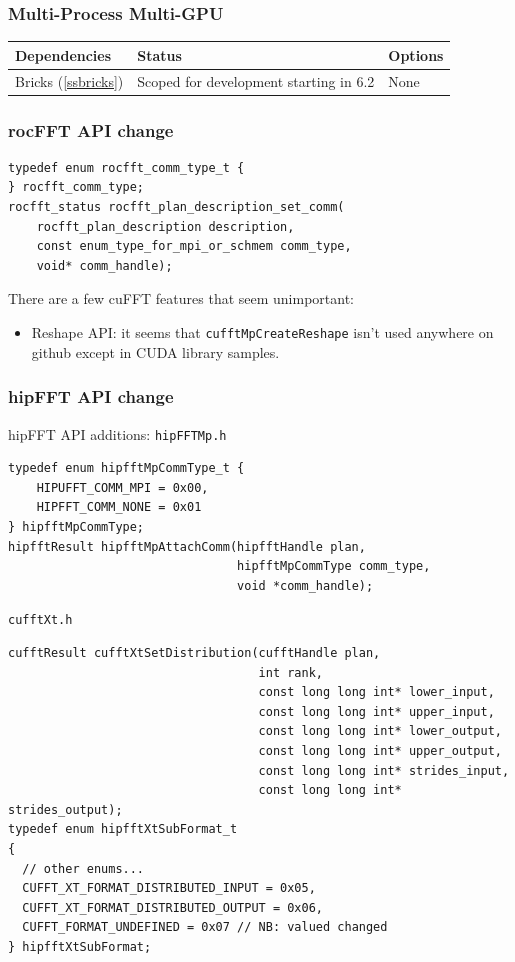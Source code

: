 \documentclass[12pt]{article}
\renewcommand{\(}{\left(}
\renewcommand{\)}{\right)}
\begin{document}
\newpage
\subsubsection{Multi-Process Multi-GPU}
\label{ssmpmgpu}

\begin{center}
  \begin{tabular}{|l|l|l|}
    \hline
    Dependencies & Status & Options \\
    \hline
    Bricks (\ref{ssbricks}) & Scoped for development starting in 6.2  & None \\
    \hline
  \end{tabular}
\end{center}


\subsubsection{rocFFT API change}
\begin{lstlisting}
typedef enum rocfft_comm_type_t {
} rocfft_comm_type;
rocfft_status rocfft_plan_description_set_comm(
    rocfft_plan_description description,
    const enum_type_for_mpi_or_schmem comm_type,
    void* comm_handle);
\end{lstlisting}

 There are a few cuFFT
features that seem unimportant:
\begin{itemize}
\item Reshape API: it seems that \texttt{cufftMpCreateReshape} isn't
  used anywhere on github except in CUDA library samples.
\end{itemize}

\subsubsection{hipFFT API change}
\noindent
hipFFT API additions:
\texttt{hipFFTMp.h}
\begin{lstlisting}
typedef enum hipfftMpCommType_t {
    HIPUFFT_COMM_MPI = 0x00,
    HIPFFT_COMM_NONE = 0x01
} hipfftMpCommType;
hipfftResult hipfftMpAttachComm(hipfftHandle plan,
                                hipfftMpCommType comm_type,
                                void *comm_handle);
\end{lstlisting}
\texttt{cufftXt.h}
\begin{lstlisting}
cufftResult cufftXtSetDistribution(cufftHandle plan, 
                                   int rank, 
                                   const long long int* lower_input,  
                                   const long long int* upper_input,
                                   const long long int* lower_output,
                                   const long long int* upper_output,
                                   const long long int* strides_input, 
                                   const long long int* strides_output);
typedef enum hipfftXtSubFormat_t
{
  // other enums...
  CUFFT_XT_FORMAT_DISTRIBUTED_INPUT = 0x05,
  CUFFT_XT_FORMAT_DISTRIBUTED_OUTPUT = 0x06,
  CUFFT_FORMAT_UNDEFINED = 0x07 // NB: valued changed
} hipfftXtSubFormat;
\end{lstlisting}
\end{document}

